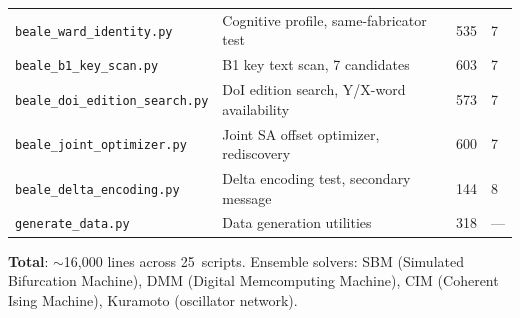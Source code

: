 \documentclass[11pt,a4paper]{article}
\begin{document}
\begin{center}
\begin{tabular}{@{}llrl@{}}
\texttt{beale\_ward\_identity.py} & Cognitive profile, same-fabricator test & 535 & 7 \\
\texttt{beale\_b1\_key\_scan.py} & B1 key text scan, 7 candidates & 603 & 7 \\
\texttt{beale\_doi\_edition\_search.py} & DoI edition search, Y/X-word availability & 573 & 7 \\
\texttt{beale\_joint\_optimizer.py} & Joint SA offset optimizer, rediscovery & 600 & 7 \\
\texttt{beale\_delta\_encoding.py} & Delta encoding test, secondary message & 144 & 8 \\
\texttt{generate\_data.py} & Data generation utilities & 318 & --- \\
\bottomrule
\end{tabular}
\end{center}

\noindent\textbf{Total}: $\sim$16{,}000 lines across 25~scripts.
Ensemble solvers: SBM (Simulated Bifurcation Machine),
DMM (Digital Memcomputing Machine), CIM (Coherent Ising Machine),
Kuramoto (oscillator network).
\end{document}
